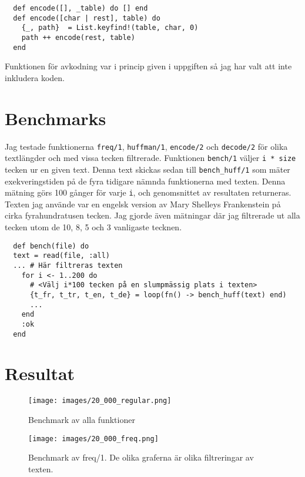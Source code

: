 \documentclass[a4paper,11pt]{article}
\begin{document}
\begin{verbatim}
  def encode([], _table) do [] end
  def encode([char | rest], table) do
    {_, path}  = List.keyfind!(table, char, 0)
    path ++ encode(rest, table)
  end
\end{verbatim}

Funktionen för avkodning var i princip given i uppgiften så jag har valt att inte inkludera koden.

\section*{Benchmarks}
Jag testade funktionerna {\tt freq/1}, {\tt huffman/1}, {\tt encode/2} och {\tt decode/2} för olika textlängder och med vissa tecken filtrerade. Funktionen {\tt bench/1} väljer {\tt i * size} tecken ur en given text. Denna text skickas sedan till {\tt bench\_huff/1} som mäter exekveringstiden på de fyra tidigare nämnda funktionerna med texten. Denna mätning görs 100 gånger för varje {\tt i}, och genomsnittet av resultaten returneras.\\
Texten jag använde var en engelsk version av Mary Shelleys Frankenstein på cirka fyrahundratusen tecken. Jag gjorde även mätningar där jag filtrerade ut alla tecken utom de 10, 8, 5 och 3 vanligaste tecknen.

\begin{verbatim}
  def bench(file) do
  text = read(file, :all)
  ... # Här filtreras texten
    for i <- 1..200 do
      # <Välj i*100 tecken på en slumpmässig plats i texten>
      {t_fr, t_tr, t_en, t_de} = loop(fn() -> bench_huff(text) end)
      ...
    end
    :ok  
  end    
\end{verbatim}

\section*{Resultat}
\begin{figure}[H]
  \begin{centering}
    \texttt{[image: images/20\_000\_regular.png]}
    \caption{Benchmark av alla funktioner}
    \label{fig:bench_all}
  \end{centering}
\end{figure}

\begin{figure}[H]
  \begin{centering}
    \texttt{[image: images/20\_000\_freq.png]}
    \caption{Benchmark av freq/1. De olika graferna är olika filtreringar av texten.}
    \label{fig:bench_freq}
  \end{centering}
\end{figure}
\end{document}
